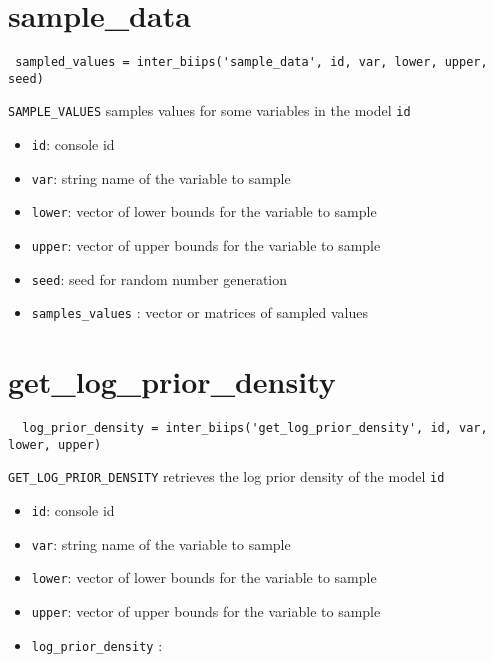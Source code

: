 \documentclass[11pt]{article}
\begin{document}
\section{sample\_data}

 \begin{lstlisting} 
 sampled_values = inter_biips('sample_data', id, var, lower, upper, seed)
 \end{lstlisting}

  \texttt{SAMPLE\_VALUES} samples values for some variables in the model \texttt{id}

  \begin{itemize}
   \item \texttt{id}: console id
   \item \texttt{var}: string name of the variable to sample 
   \item \texttt{lower}: vector of lower bounds for the variable to sample
   \item \texttt{upper}: vector of upper bounds for the variable to sample 
   \item \texttt{seed}: seed for random number generation 
   \item \texttt{samples_values} : vector or matrices of sampled values
   \end{itemize}

   \section{get\_log\_prior\_density}

 \begin{lstlisting} 
  log_prior_density = inter_biips('get_log_prior_density', id, var, lower, upper)
 \end{lstlisting}
    \texttt{GET\_LOG\_PRIOR\_DENSITY} retrieves the log prior density of the model \texttt{id}

 \begin{itemize}
   \item \texttt{id}: console id
   \item \texttt{var}: string name of the variable to sample 
   \item \texttt{lower}: vector of lower bounds for the variable to sample
   \item \texttt{upper}: vector of upper bounds for the variable to sample 
   \item \texttt{log_prior_density} :  
   \end{itemize}
\end{document}
